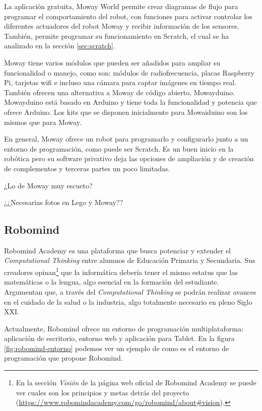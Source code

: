 La aplicación gratuita, Moway World permite crear diagramas de flujo para programar el comportamiento del robot, con funciones para activar controlar los diferentes actuadores del robot Moway y recibir información de los sensores. También, permite programar su funcionamiento en Scratch, el cual se ha analizado en la sección \ref{sec:scratch}. 

Moway tiene varios módulos que pueden ser añadidos para ampliar su funcionalidad o manejo, como son: módulos de radiofrecuencia, placas Raspberry Pi, tarjetas wifi e incluso una cámara para captar imágenes en tiempo real. También ofrecen una alternativa a Moway de código abierto, Mowayduino. Mowayduino está basado en Arduino y tiene toda la funcionalidad y potencia que ofrece Arduino. Los kits que se disponen inicialmente para Mowaiduino son los mismos que para Moway.

{\color{blue}
En general, Moway ofrece un robot para programarlo y configurarlo junto a un entorno de programación, como puede ser Scratch. Es un buen inicio en la robótica pero su software privativo deja las opciones de ampliación y de creación de complementos y terceras partes un poco limitadas.
}

{\color{red}
¿Lo de Moway muy escueto?

¿¿Necesarias fotos en Lego y Moway??
}


\subsection{Robomind}
\label{sec:robomind}


Robomind Academy\cite{robomind-web} es una plataforma que busca potenciar y extender el \emph{Computational Thinking} entre alumnos de Educación Primaria y Secundaria. Sus creadores opinan\footnote{En la sección \emph{Visión} de la página web oficial de Robomind Academy se puede ver cuales son los principios y metas detrás del proyecto (\url{https://www.robomindacademy.com/go/robomind/about#vision}).} que la informática debería tener el mismo estatus que las matemáticas o la lengua, algo esencial en la formación del estudiante. Argumentan que, a través del \emph{Computational Thinking} se podrán realizar avances en el cuidado de la salud o la industria, algo totalmente necesario en pleno Siglo XXI. 


Actualmente, Robomind ofrece un entorno de programación multiplataforma: aplicación de escritorio, entorno web y aplicación para Tablet. En la figura \ref{fig:robomind-entorno} podemos ver un ejemplo de como es el entorno de programación que propone Robomind.


